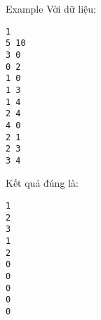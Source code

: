 Example
Với dữ liệu:  
\begin{verbatim}
1
5 10
3 0
0 2
1 0
1 3
1 4
2 4
4 0
2 1
2 3
3 4
\end{verbatim}

   Kết quả đúng là:  
\begin{verbatim}
1
2
3
1
2
0
0
0
0
0
\end{verbatim}